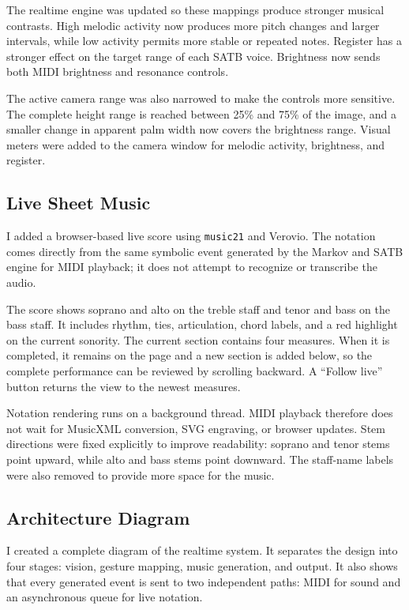 \documentclass[11pt,a4paper]{article}
\begin{document}
The realtime engine was updated so these mappings produce stronger musical
contrasts. High melodic activity now produces more pitch changes and larger
intervals, while low activity permits more stable or repeated notes. Register
has a stronger effect on the target range of each SATB voice. Brightness now
sends both MIDI brightness and resonance controls.

The active camera range was also narrowed to make the controls more sensitive.
The complete height range is reached between 25\% and 75\% of the image, and a
smaller change in apparent palm width now covers the brightness range. Visual
meters were added to the camera window for melodic activity, brightness, and
register.

\subsection{Live Sheet Music}

I added a browser-based live score using \texttt{music21} and Verovio. The
notation comes directly from the same symbolic event generated by the Markov
and SATB engine for MIDI playback; it does not attempt to recognize or
transcribe the audio.

The score shows soprano and alto on the treble staff and tenor and bass on the
bass staff. It includes rhythm, ties, articulation, chord labels, and a red
highlight on the current sonority. The current section contains four measures.
When it is completed, it remains on the page and a new section is added below,
so the complete performance can be reviewed by scrolling backward. A
``Follow live'' button returns the view to the newest measures.

Notation rendering runs on a background thread. MIDI playback therefore does
not wait for MusicXML conversion, SVG engraving, or browser updates. Stem
directions were fixed explicitly to improve readability: soprano and tenor
stems point upward, while alto and bass stems point downward. The staff-name
labels were also removed to provide more space for the music.

\subsection{Architecture Diagram}

I created a complete diagram of the realtime system. It separates the design
into four stages: vision, gesture mapping, music generation, and output. It
also shows that every generated event is sent to two independent paths: MIDI
for sound and an asynchronous queue for live notation.
\end{document}
